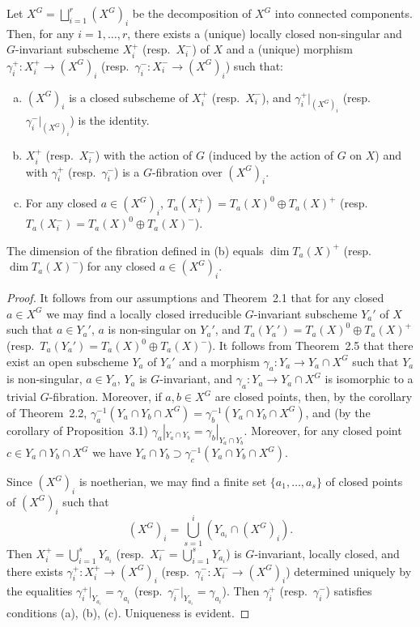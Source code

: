 \documentclass[12pt]{article}
\begin{document}
\begin{theorem}
Let $X^G = \bigsqcup_{i=1}^r (X^G)_i$ be the decomposition of $X^G$ into connected components. Then, for any $i = 1, \dots, r$, there exists a (unique) locally closed non-singular and $G$-invariant subscheme $X_i^+$ (resp.\ $X_i^-$) of $X$ and a (unique) morphism $\gamma_i^+ : X_i^+ \to (X^G)_i$ (resp.\ $\gamma_i^- : X_i^- \to (X^G)_i$) such that:
\begin{enumerate}[(a)]
  \item $(X^G)_i$ is a closed subscheme of $X_i^+$ (resp.\ $X_i^-$), and $\gamma_i^+|_{(X^G)_i}$ (resp.\ $\gamma_i^-|_{(X^G)_i}$) is the identity.
  \item $X_i^+$ (resp.\ $X_i^-$) with the action of $G$ (induced by the action of $G$ on $X$) and with $\gamma_i^+$ (resp.\ $\gamma_i^-$) is a $G$-fibration over $(X^G)_i$.
  \item For any closed $a \in (X^G)_i$, $T_a(X_i^+) = T_a(X)^0 \oplus T_a(X)^+$ (resp.\ $T_a(X_i^-) = T_a(X)^0 \oplus T_a(X)^-$).
\end{enumerate}
The dimension of the fibration defined in (b) equals $\dim T_a(X)^+$ (resp.\ $\dim T_a(X)^-$) for any closed $a \in (X^G)_i$.
\end{theorem}

\begin{proof}
It follows from our assumptions and Theorem~2.1 that for any closed $a \in X^G$ we may find a locally closed irreducible $G$-invariant subscheme $Y_a'$ of $X$ such that $a \in Y_a'$, $a$ is non-singular on $Y_a'$, and $T_a(Y_a') = T_a(X)^0 \oplus T_a(X)^+$ (resp.\ $T_a(Y_a') = T_a(X)^0 \oplus T_a(X)^-$). It follows from Theorem~2.5 that there exist an open subscheme $Y_a$ of $Y_a'$ and a morphism $\gamma_a : Y_a \to Y_a \cap X^G$ such that $Y_a$ is non-singular, $a \in Y_a$, $Y_a$ is $G$-invariant, and $\gamma_a : Y_a \to Y_a \cap X^G$ is isomorphic to a trivial $G$-fibration. Moreover, if $a,b \in X^G$ are closed points, then, by the corollary of Theorem~2.2, $\gamma_a^{-1}(Y_a \cap Y_b \cap X^G) = \gamma_b^{-1}(Y_a \cap Y_b \cap X^G)$, and (by the corollary of Proposition~3.1) $\gamma_a|_{Y_a \cap Y_b} = \gamma_b|_{Y_a \cap Y_b}$. Moreover, for any closed point $c \in Y_a \cap Y_b \cap X^G$ we have $Y_a \cap Y_b \supset \gamma_c^{-1}(Y_a \cap Y_b \cap X^G)$.

Since $(X^G)_i$ is noetherian, we may find a finite set $\{a_1, \dots, a_s\}$ of closed points of $(X^G)_i$ such that
\[
   (X^G)_i = \bigcup_{s=1}^i (Y_{a_i} \cap (X^G)_i).
\]
Then $X_i^+ = \bigcup_{i=1}^s Y_{a_i}$ (resp.\ $X_i^- = \bigcup_{i=1}^s Y_{a_i}$) is $G$-invariant, locally closed, and there exists $\gamma_i^+ : X_i^+ \to (X^G)_i$ (resp.\ $\gamma_i^- : X_i^- \to (X^G)_i$) determined uniquely by the equalities $\gamma_i^+|_{Y_{a_i}} = \gamma_{a_i}$ (resp.\ $\gamma_i^-|_{Y_{a_i}} = \gamma_{a_i}$). Then $\gamma_i^+$ (resp.\ $\gamma_i^-$) satisfies conditions (a), (b), (c). Uniqueness is evident.
\end{proof}
\end{document}
